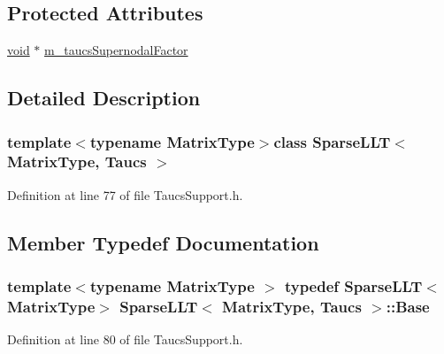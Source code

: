 \subsection*{Protected Attributes}
\begin{DoxyCompactItemize}
\item 
\hyperlink{group___u_a_v_objects_plugin_ga444cf2ff3f0ecbe028adce838d373f5c}{void} $\ast$ \hyperlink{class_sparse_l_l_t_3_01_matrix_type_00_01_taucs_01_4_a3b6f70482493394ddd42075dab3336bb}{m\-\_\-taucs\-Supernodal\-Factor}
\end{DoxyCompactItemize}


\subsection{Detailed Description}
\subsubsection*{template$<$typename Matrix\-Type$>$class Sparse\-L\-L\-T$<$ Matrix\-Type, Taucs $>$}



Definition at line 77 of file Taucs\-Support.\-h.



\subsection{Member Typedef Documentation}
\hypertarget{class_sparse_l_l_t_3_01_matrix_type_00_01_taucs_01_4_aa32ceb8ea9072662365579ce983b2d4d}{
\subsubsection[{Base}]{\setlength{\rightskip}{0pt plus 5cm}template$<$typename Matrix\-Type $>$ typedef {\bf Sparse\-L\-L\-T}$<$Matrix\-Type$>$ {\bf Sparse\-L\-L\-T}$<$ Matrix\-Type, {\bf Taucs} $>$\-::{\bf Base}\hspace{0.3cm}{\ttfamily [protected]}}}\label{class_sparse_l_l_t_3_01_matrix_type_00_01_taucs_01_4_aa32ceb8ea9072662365579ce983b2d4d}


Definition at line 80 of file Taucs\-Support.\-h.

